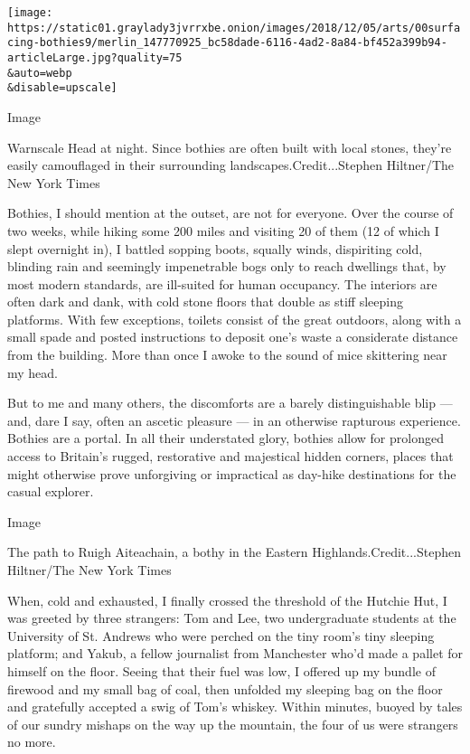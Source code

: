 \texttt{[image: https://static01.graylady3jvrrxbe.onion/images/2018/12/05/arts/00surfacing-bothies9/merlin\_147770925\_bc58dade-6116-4ad2-8a84-bf452a399b94-articleLarge.jpg?quality=75\\\&auto=webp\\\&disable=upscale]}

Image

Warnscale Head at night. Since bothies are often built with local
stones, they're easily camouflaged in their surrounding
landscapes.Credit...Stephen Hiltner/The New York Times

Bothies, I should mention at the outset, are not for everyone. Over the
course of two weeks, while hiking some 200 miles and visiting 20 of them
(12 of which I slept overnight in), I battled sopping boots, squally
winds, dispiriting cold, blinding rain and seemingly impenetrable bogs
only to reach dwellings that, by most modern standards, are ill-suited
for human occupancy. The interiors are often dark and dank, with cold
stone floors that double as stiff sleeping platforms. With few
exceptions, toilets consist of the great outdoors, along with a small
spade and posted instructions to deposit one's waste a considerate
distance from the building. More than once I awoke to the sound of mice
skittering near my head.

But to me and many others, the discomforts are a barely distinguishable
blip --- and, dare I say, often an ascetic pleasure --- in an otherwise
rapturous experience. Bothies are a portal. In all their understated
glory, bothies allow for prolonged access to Britain's rugged,
restorative and majestical hidden corners, places that might otherwise
prove unforgiving or impractical as day-hike destinations for the casual
explorer.

Image

The path to Ruigh Aiteachain, a bothy in the Eastern
Highlands.Credit...Stephen Hiltner/The New York Times

When, cold and exhausted, I finally crossed the threshold of the Hutchie
Hut, I was greeted by three strangers: Tom and Lee, two undergraduate
students at the University of St. Andrews who were perched on the tiny
room's tiny sleeping platform; and Yakub, a fellow journalist from
Manchester who'd made a pallet for himself on the floor. Seeing that
their fuel was low, I offered up my bundle of firewood and my small bag
of coal, then unfolded my sleeping bag on the floor and gratefully
accepted a swig of Tom's whiskey. Within minutes, buoyed by tales of our
sundry mishaps on the way up the mountain, the four of us were strangers
no more.

